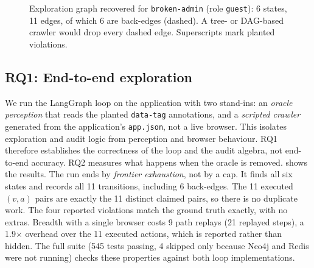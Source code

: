 \begin{figure}[t]
\centering
{}
\caption{Exploration graph recovered for \texttt{broken-admin} (role
\texttt{guest}): 6 states, 11 edges, of which 6 are back-edges (dashed). A
tree- or DAG-based crawler would drop every dashed edge. Superscripts mark
planted violations.}
\label{fig:app}
\end{figure}

\subsection{RQ1: End-to-end exploration}
\label{sec:eval:rq1}

We run the LangGraph loop on the application with two stand-ins: an
\emph{oracle perception} that reads the planted \texttt{data-tag} annotations,
and a \emph{scripted crawler} generated from the application's
\texttt{app.json}, not a live browser. This isolates exploration and audit
logic from perception and browser behaviour. RQ1 therefore establishes the
correctness of the loop and the audit algebra, not end-to-end accuracy. RQ2
measures what happens when the oracle is removed.  shows the results. The run
ends by \emph{frontier exhaustion}, not by a cap. It finds all six states and
records all 11 transitions, including 6 back-edges. The 11 executed
$(v,a)$ pairs are exactly the 11 distinct claimed pairs, so there is no
duplicate work. The four reported violations match the ground truth exactly,
with no extras. Breadth with a single browser costs 9 path replays
(21 replayed steps), a 1.9$\times$ overhead over the 11 executed actions,
which is reported rather than hidden. The full suite (545 tests passing,
4 skipped only because Neo4j and Redis were not running) checks these
properties against both loop implementations.

